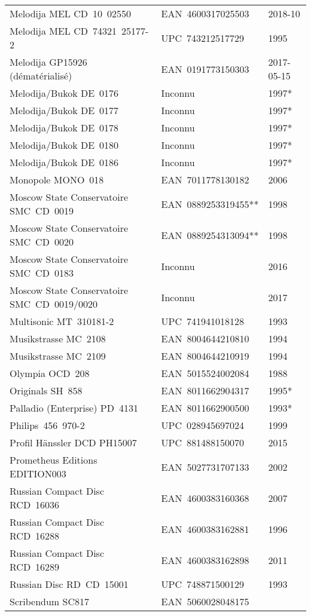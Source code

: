 {\begin{longtable}[c]{lll}
 Melodija MEL CD~10~02550
 & EAN~4600317025503
 & 2018-10 \\
 Melodija MEL CD~74321~\hbox{25177-2}
 & UPC~743212517729
 & 1995 \\
 Melodija GP15926 (dématérialisé)
 & EAN~0191773150303
 & 2017-05-15 \\
 Melodija/Bukok DE~0176
 & Inconnu
 & 1997* \\
 Melodija/Bukok DE~0177
 & Inconnu
 & 1997* \\
 Melodija/Bukok DE~0178
 & Inconnu
 & 1997* \\
 Melodija/Bukok DE~0180
 & Inconnu
 & 1997* \\
 Melodija/Bukok DE~0186
 & Inconnu
 & 1997* \\
 Monopole MONO~018
 & EAN~7011778130182
 & 2006 \\
 Moscow State Conservatoire SMC~CD~0019
 & EAN~0889253319455**
 & 1998 \\
 Moscow State Conservatoire SMC~CD~0020
 & EAN~0889254313094**
 & 1998 \\
 Moscow State Conservatoire SMC~CD~0183
 & Inconnu
 & 2016 \\
 Moscow State Conservatoire SMC~CD~0019/0020
 & Inconnu
 & 2017 \\
 Multisonic MT~\hbox{310181-2}
 & UPC~741941018128
 & 1993 \\
 Musikstrasse MC~2108
 & EAN~8004644210810
 & 1994 \\
 Musikstrasse MC~2109
 & EAN~8004644210919
 & 1994 \\
 Olympia OCD~208
 & EAN~5015524002084
 & 1988 \\
 Originals SH~858
 & EAN~8011662904317
 & 1995* \\
 Palladio (Enterprise) PD~4131
 & EAN~8011662900500
 & 1993* \\
 Philips~456~\hbox{970-2}
 & UPC~028945697024
 & 1999 \\
 Profil Hänssler DCD PH15007
 & UPC~881488150070
 & 2015 \\
 Prometheus Editions EDITION003
 & EAN~5027731707133
 & 2002 \\
 Russian Compact Disc RCD~16036
 & EAN~4600383160368
 & 2007 \\
 Russian Compact Disc RCD~16288
 & EAN~4600383162881
 & 1996 \\
 Russian Compact Disc RCD~16289
 & EAN~4600383162898
 & 2011 \\
 Russian Disc RD~CD~15001
 & UPC~748871500129
 & 1993 \\
 Scribendum SC817
 & EAN~5060028048175

\end{longtable}}
